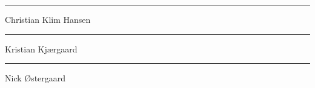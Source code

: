 { \centering

  \vspace{3cm}

  \begin{minipage}{0.7\textwidth}
    \hrule 
    Christian Klim Hansen
    \vspace{1.5cm}
    \hrule
    Kristian Kjærgaard
    \vspace{1.5cm}
    \hrule
    Nick Østergaard
  \end{minipage}

}


